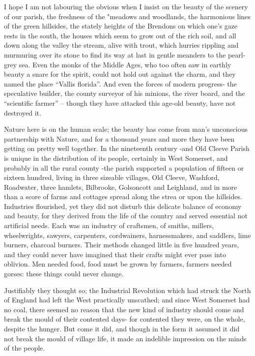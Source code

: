 I hope I am not labouring the obvious when I insist on the beauty of the scenery of our parish, the freshness of the "meadows and woodlands, the harmonious lines of the green hillsides, the stately heights of the Brendons on which one's gaze rests in the south, the houses which seem to grow out of the rich soil, and all down along the valley the stream, alive with trout, which hurries rippling and murmuring over its stone to find its way at last in gentle meanders to the pearl-grey sea. Even the monks of the Middle Ages, who too often saw in earthly beauty a snare for the spirit, could not hold out against the charm, and they named the place “Vallis florida”. And even the forces of modern progress- the speculative builder, the county surveyor of his minions, the river board, and the “scientific farmer” – though they have attacked this age-old beauty, have not destroyed it. 

Nature here is on the human scale; the beauty has come from man's unconscious partnership with Nature, and for a thousand years and more they have been getting on pretty well together. In the nineteenth century -and Old Cleeve Parish is unique in the distribution of its people, certainly in West Somerset, and probably in all the rural county -the parish supported a population of fifteen or sixteen hundred, living in three sizeable villages, Old Cleeve, Washford, Roadwater, three hamlets, Bilbrooke, Golsoncott and Leighland, and in more than a score of farms and cottages spread along the strea or upon the hillsides. Industries flourished, yet they did not disturb this delicate balance of economy and beauty, for they derived from the life of the country and served essential not artificial needs. Each was an industry of craftsmen, of smiths, millers, wheelwrights, sawyers, carpenters, cordwainers, harnessmakers, and saddlers, lime burners, charcoal burners. Their methods changed little in five hundred years, and they could never have imagined that their crafts might ever pass into oblivion. Men needed food, food must be grown by farmers, farmers needed gorses: these things could never change.

Justifiably they thought so; the Industrial Revolution which had struck the North of England had left the West practically unscathed; and since West Somerset had no coal, there seemed no reason that the new kind of industry should come and break the mould of their contented days- for contented they were, on the whole, despite the hunger. But come it did, and though in the form it assumed it did not break the mould of village life, it made an indelible impression on the minds of the people. 

